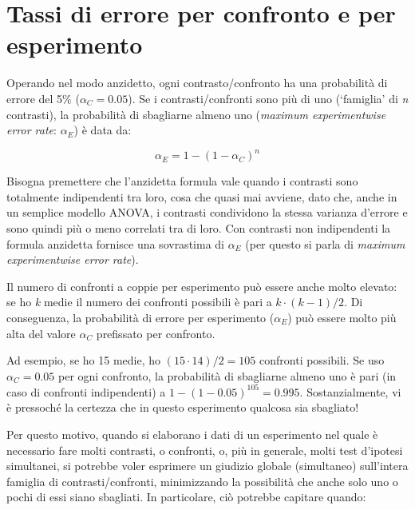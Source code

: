 \documentclass[a4paper,12pt,oneside]{book}
\begin{document}
\hypertarget{tassi-di-errore-per-confronto-e-per-esperimento}{%
\section{Tassi di errore per confronto e per esperimento}\label{tassi-di-errore-per-confronto-e-per-esperimento}}

Operando nel modo anzidetto, ogni contrasto/confronto ha una probabilità di errore del 5\% (\(\alpha_C = 0.05\)). Se i contrasti/confronti sono più di uno (`famiglia' di \emph{n} contrasti), la probabilità di sbagliarne almeno uno (\emph{maximum experimentwise error rate}: \(\alpha_E\)) è data da:

\[\alpha_E = 1 - (1 - \alpha_C)^n\]

Bisogna premettere che l'anzidetta formula vale quando i contrasti sono totalmente indipendenti tra loro, cosa che quasi mai avviene, dato che, anche in un semplice modello ANOVA, i contrasti condividono la stessa varianza d'errore e sono quindi più o meno correlati tra di loro. Con contrasti non indipendenti la formula anzidetta fornisce una sovrastima di \(\alpha_E\) (per questo si parla di \emph{maximum experimentwise error rate}).

Il numero di confronti a coppie per esperimento può essere anche molto elevato: se ho \emph{k} medie il numero dei confronti possibili è pari a \(k \cdot (k-1)/2\). Di conseguenza, la probabilità di errore per esperimento (\(\alpha_E\)) può essere molto più alta del valore \(\alpha_C\) prefissato per confronto.

Ad esempio, se ho 15 medie, ho \((15 \cdot 14)/2 = 105\) confronti possibili. Se uso \(\alpha_C = 0.05\) per ogni confronto, la probabilità di sbagliarne almeno uno è pari (in caso di confronti indipendenti) a \(1 - (1 - 0.05)^105 = 0.995\). Sostanzialmente, vi è pressoché la certezza che in questo esperimento qualcosa sia sbagliato!

Per questo motivo, quando si elaborano i dati di un esperimento nel quale è necessario fare molti contrasti, o confronti, o, più in generale, molti test d'ipotesi simultanei, si potrebbe voler esprimere un giudizio globale (simultaneo) sull'intera famiglia di contrasti/confronti, minimizzando la possibilità che anche solo uno o pochi di essi siano sbagliati. In particolare, ciò potrebbe capitare quando:
\end{document}
